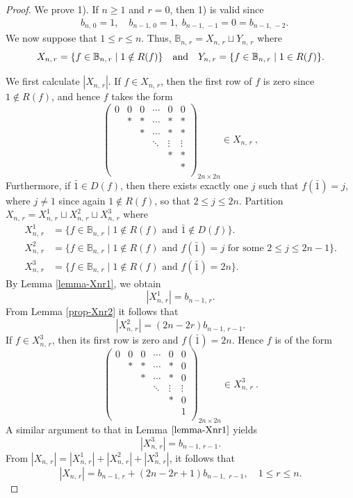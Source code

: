 \documentclass[11pt]{article}
\newcommand{\q}{\quad}
\newcommand{\ges}{\geqslant}
\newcommand{\les}{\leqslant}
\begin{document}
\begin{proof}

We prove 1). 
%
If $n\ges 1$ and $r=0$, then 1) is valid since
\begin{align*}
&b_{n,\,0}=1,\q b_{n-1,\,0}=1, \;b_{n-1,\,-1}=0=b_{n-1,\,-2}.
\end{align*}
%
We now suppose that $1\les r\les n$. Thus, $\mathbb B_{n,\,r}= X_{n,\,r}\sqcup Y_{n,\,r}$ where 
\[
X_{n,\,r}=\{f\in \mathbb B_{n,\,r}\mid 1\notin R(f)\}\text{\quad and\quad}
Y_{n,\,r}=\{f\in \mathbb B_{n,\,r}\mid 1\in R(f)\}.
\]

We first calculate $|X_{n,\,r}|$. If $f\in X_{n,\,r}$, then the first row of $f$ is zero since $1\notin R(f)$, and hence $f$ takes the form
\[
\begin{pmatrix}
            0 & 0 & 0 &\cdots & 0& 0 \\
              & * & * &\cdots & *& *  \\
              &   & * &\cdots & *& * \\
              &   &   &\ddots &\vdots&\vdots \\
              &   &   &       & *& *  \\
              &   &   &       &  & *  \\
             \end{pmatrix}_{2n \times 2n} \in X_{n,\,r}~,
\]
%
Furthermore, if $\bar 1\in D(f)$, then there exists exactly one $j$ such that $f(\bar{1})=j$, where $j\ne 1$ since again $1\notin R(f)$, so that $2\les j\les 2n$. 
%
Partition $X_{n,\,r}=X_{n,\,r}^1\sqcup X_{n,\,r}^2\sqcup X_{n,\,r}^3$ where
\begin{align*}
X_{n,\,r}^1&=\{f\in \mathbb B_{n,\,r} \mid 1\notin R(f)\text{ and } \bar 1\notin D(f)\}.\\
X_{n,\,r}^2&=\{f\in \mathbb B_{n,\,r} \mid 1\notin R(f)\text{ and } f(\bar{1})=j \text{ for some } 2\les j\les 2n-1\}.\\
X_{n,\,r}^3&=\{f\in \mathbb B_{n,\,r}\mid 1\notin R(f) \text{ and } f(\bar{1})=2n\}.
\end{align*}
%
By Lemma \ref{lemma-Xnr1}, we obtain $$|X_{n,\,r}^1|=b_{n-1,\,r}.$$
%
From Lemma \ref{prop-Xnr2} it follows that  
$$|X_{n,\,r}^2|=(2n-2r)b_{n-1,\,r-1}.$$
If $f\in X_{n,\,r}^3$, then its first row is zero and $f(\bar{1})=2n$. Hence $f$ is of the form
\[
\begin{pmatrix}
            0 & 0 & 0 &\cdots & 0& 0 \\
              & * & * &\cdots & *& 0  \\
              &   & * &\cdots & *& 0 \\
              &   &   &\ddots &\vdots&\vdots \\
              &   &   &       & *& 0  \\
              &   &   &       &  & 1  \\
             \end{pmatrix}_{2n \times 2n}\in X_{n,\,r}^3~.
\]
A similar argument to that in Lemma $\ref{lemma-Xnr1}$ yields
\[
    |X_{n,\,r}^3|=b_{n-1,\,r-1}.
\]
From $|X_{n,\,r}| = |X_{n,\,r}^1|+|X_{n,\,r}^2|+|X_{n,\,r}^3|$, it follows that
\[\label{Xnr}
   |X_{n,\,r}| = b_{n-1, \,r} + (2n-2r+1) b_{n-1,\, ~r-1}, \q 1\les r\les n.\tag{1}
\]


\end{proof}
\end{document}
